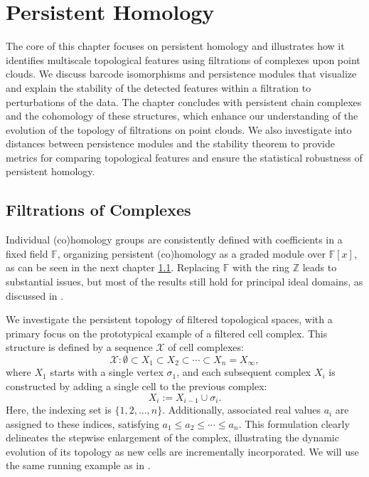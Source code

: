 \section{Persistent Homology}
The core of this chapter focuses on persistent homology and illustrates how it
identifies multiscale topological features using filtrations of complexes upon point clouds. We discuss barcode isomorphisms and persistence modules that
visualize and explain the stability of the detected features within a filtration to perturbations of the data. The chapter concludes with persistent chain complexes and the cohomology of these structures, which enhance our understanding of the evolution of the topology of filtrations on point clouds. We also investigate into distances between persistence modules and the stability theorem to provide metrics for comparing topological features and ensure the statistical robustness of persistent homology.

\subsection{Filtrations of Complexes}
Individual (co)homology groups are consistently defined with coefficients in a
fixed field $\mathbb{F}$, organizing persistent (co)homology as a graded module
over $\mathbb{F}[x]$, as can be seen in the next chapter \ref{}. Replacing
$\mathbb{F}$ with the ring $\mathbb{Z}$ leads to substantial issues, but most of
the results still hold for principal ideal domains, as discussed in
\cite[\S 3.1]{zomorodian2004computing}.

We investigate the persistent topology of filtered topological spaces, with a primary
focus on the prototypical example of a filtered cell complex. This structure is
defined by a sequence $\mathcal{X}$ of cell complexes:
\begin{equation*}
	\mathcal{X}: \emptyset \subset X_{1} \subset X_{2} \subset \cdots \subset X_{n}
	= X_{\infty},
\end{equation*}
where $X_{1}$ starts with a single vertex $\sigma_{1}$, and each subsequent
complex $X_{i}$ is constructed by adding a single cell to the previous complex:
\begin{equation*}
	X_{i} := X_{i-1}\cup \sigma_{i}.
\end{equation*}
Here, the indexing set is $\{1, 2, \ldots, n\}$. Additionally, associated real
values $a_{i}$ are assigned to these indices, satisfying $a_{1} \leq a_{2} \leq \cdots
\leq a_{n}.$ This formulation clearly delineates the stepwise enlargement of the
complex, illustrating the dynamic evolution of its topology as new cells are
incrementally incorporated. We will use the same running example as in \cite[\S 2.2]{de2011dualities}.

